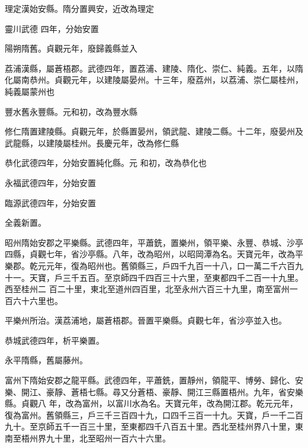 \begin{pinyinscope}
 理定漢始安縣。隋分置興安，近改為理定



 靈川武德
 四年，分始安置



 陽朔隋舊。貞觀元年，廢歸義縣並入



 荔浦漢縣，屬蒼梧郡。武德四年，置荔浦、建陵、隋化、崇仁、純義。五年，以隋化屬南恭州。貞觀元年，以建陵屬晏州。十三年，廢荔州，以荔浦、崇仁屬桂州，純義屬蒙州也



 豐水舊永豐縣。元和初，改為豐水縣



 修仁隋置建陵縣。貞觀元年，於縣置晏州，領武龍、建陵二縣。十二年，廢晏州及武龍縣，以建陵屬桂州。長慶元年，改為修仁縣



 恭化武德四年，分始安置純化縣。元
 和初，改為恭化也



 永福武德四年，分始安置



 臨源武德四年，分始安置



 全義新置。



 昭州隋始安郡之平樂縣。武德四年，平蕭銑，置樂州，領平樂、永豐、恭城、沙亭四縣，貞觀七年，省沙亭縣。八年，改為昭州，以昭岡潭為名。天寶元年，改為平樂郡。乾元元年，復為昭州也。舊領縣三，戶四千九百一十八，口一萬二千六百九十一。天寶，戶三千五百。至京師四千四百三十六里，至東都四千二百一十九里。西至桂州二
 百二十里，東北至道州四百里，北至永州六百三十九里，南至富州一百六十六里也。



 平樂州所治。漢荔浦地，屬蒼梧郡。晉置平樂縣。貞觀七年，省沙亭並入也。



 恭城武德四年，析平樂置。



 永平隋縣，舊屬藤州。



 富州下隋始安郡之龍平縣。武德四年，平蕭銑，置靜州，領龍平、博勞、歸化、安樂、開江、豪靜、蒼梧七縣。尋又分蒼梧、豪靜、開江三縣置梧州。九年，省安樂縣。貞觀八
 年，改為富州，以富川水為名。天寶元年，改為開江郡。乾元元年，復為富州。舊領縣三，戶三千三百四十九，口四千三百一十九。天寶，戶一千二百九十。至京師五千一百三十里，至東都四千八百五十里。西北至桂州界八十里，東南至梧州界九十里，北至昭州一百六十六里。




\end{pinyinscope}
